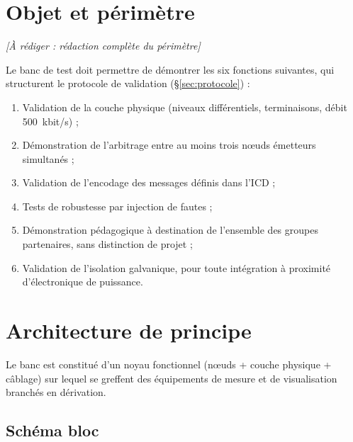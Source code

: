\documentclass[11pt,a4paper]{article}
\newcommand{\todo}[1]{\textcolor{todo}{\textit{[À rédiger : #1]}}}
\begin{document}
\section{Objet et périmètre}
\todo{rédaction complète du périmètre}

Le banc de test doit permettre de démontrer les six fonctions suivantes, qui structurent
le protocole de validation (\S\ref{sec:protocole}) :
\begin{enumerate}[nosep]
  \item Validation de la couche physique (niveaux différentiels, terminaisons, débit \SI{500}{kbit/s}) ;
  \item Démonstration de l'arbitrage entre au moins trois nœuds émetteurs simultanés ;
  \item Validation de l'encodage des messages définis dans l'ICD ;
  \item Tests de robustesse par injection de fautes ;
  \item Démonstration pédagogique à destination de l'ensemble des groupes partenaires, sans distinction de projet ;
  \item Validation de l'isolation galvanique, pour toute intégration à proximité d'électronique de puissance.
\end{enumerate}

\section{Architecture de principe}

Le banc est constitué d'un noyau fonctionnel (nœuds + couche physique + câblage) sur
lequel se greffent des équipements de mesure et de visualisation branchés en dérivation.

\subsection{Schéma bloc}
\end{document}
